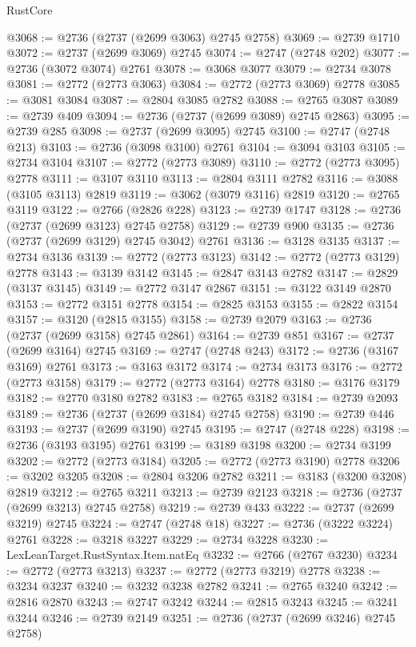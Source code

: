 \begin{lexlean}{RustCore}
\begin{coremodule}
@3068 := @2736 (@2737 (@2699 @3063) @2745 @2758)
@3069 := @2739 @1710
@3072 := @2737 (@2699 @3069) @2745
@3074 := @2747 (@2748 @202)
@3077 := @2736 (@3072 @3074) @2761
@3078 := @3068 @3077
@3079 := @2734 @3078
@3081 := @2772 (@2773 @3063)
@3084 := @2772 (@2773 @3069) @2778
@3085 := @3081 @3084
@3087 := @2804 @3085 @2782
@3088 := @2765 @3087
@3089 := @2739 @409
@3094 := @2736 (@2737 (@2699 @3089) @2745 @2863)
@3095 := @2739 @285
@3098 := @2737 (@2699 @3095) @2745
@3100 := @2747 (@2748 @213)
@3103 := @2736 (@3098 @3100) @2761
@3104 := @3094 @3103
@3105 := @2734 @3104
@3107 := @2772 (@2773 @3089)
@3110 := @2772 (@2773 @3095) @2778
@3111 := @3107 @3110
@3113 := @2804 @3111 @2782
@3116 := @3088 (@3105 @3113) @2819
@3119 := @3062 (@3079 @3116) @2819
@3120 := @2765 @3119
@3122 := @2766 (@2826 @228)
@3123 := @2739 @1747
@3128 := @2736 (@2737 (@2699 @3123) @2745 @2758)
@3129 := @2739 @900
@3135 := @2736 (@2737 (@2699 @3129) @2745 @3042) @2761
@3136 := @3128 @3135
@3137 := @2734 @3136
@3139 := @2772 (@2773 @3123)
@3142 := @2772 (@2773 @3129) @2778
@3143 := @3139 @3142
@3145 := @2847 @3143 @2782
@3147 := @2829 (@3137 @3145)
@3149 := @2772 @3147 @2867
@3151 := @3122 @3149 @2870
@3153 := @2772 @3151 @2778
@3154 := @2825 @3153
@3155 := @2822 @3154
@3157 := @3120 (@2815 @3155)
@3158 := @2739 @2079
@3163 := @2736 (@2737 (@2699 @3158) @2745 @2861)
@3164 := @2739 @851
@3167 := @2737 (@2699 @3164) @2745
@3169 := @2747 (@2748 @243)
@3172 := @2736 (@3167 @3169) @2761
@3173 := @3163 @3172
@3174 := @2734 @3173
@3176 := @2772 (@2773 @3158)
@3179 := @2772 (@2773 @3164) @2778
@3180 := @3176 @3179
@3182 := @2770 @3180 @2782
@3183 := @2765 @3182
@3184 := @2739 @2093
@3189 := @2736 (@2737 (@2699 @3184) @2745 @2758)
@3190 := @2739 @446
@3193 := @2737 (@2699 @3190) @2745
@3195 := @2747 (@2748 @228)
@3198 := @2736 (@3193 @3195) @2761
@3199 := @3189 @3198
@3200 := @2734 @3199
@3202 := @2772 (@2773 @3184)
@3205 := @2772 (@2773 @3190) @2778
@3206 := @3202 @3205
@3208 := @2804 @3206 @2782
@3211 := @3183 (@3200 @3208) @2819
@3212 := @2765 @3211
@3213 := @2739 @2123
@3218 := @2736 (@2737 (@2699 @3213) @2745 @2758)
@3219 := @2739 @433
@3222 := @2737 (@2699 @3219) @2745
@3224 := @2747 (@2748 @18)
@3227 := @2736 (@3222 @3224) @2761
@3228 := @3218 @3227
@3229 := @2734 @3228
@3230 := LexLeanTarget.RustSyntax.Item.natEq
@3232 := @2766 (@2767 @3230)
@3234 := @2772 (@2773 @3213)
@3237 := @2772 (@2773 @3219) @2778
@3238 := @3234 @3237
@3240 := @3232 @3238 @2782
@3241 := @2765 @3240
@3242 := @2816 @2870
@3243 := @2747 @3242
@3244 := @2815 @3243
@3245 := @3241 @3244
@3246 := @2739 @2149
@3251 := @2736 (@2737 (@2699 @3246) @2745 @2758)

\end{coremodule}
\end{lexlean}
